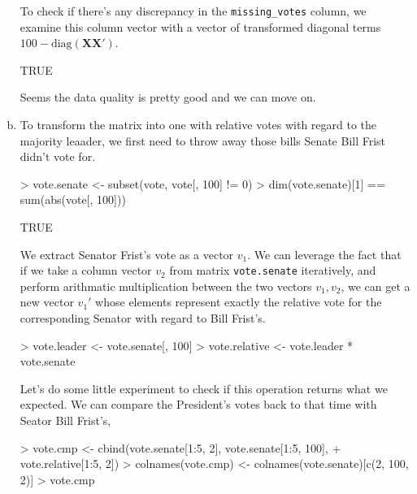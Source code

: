 \documentclass{article}
\begin{document}
\begin{enumerate}[(a)]
    To check if there's any discrepancy in the \verb=missing_votes= column, we examine this column vector with a vector of transformed diagonal terms $100 - \text{diag}(\mathbf{XX}')$.

\begin{Schunk}
\begin{Soutput}
[1] TRUE
\end{Soutput}
\end{Schunk}
    Seems the data quality is pretty good and we can move on.

    \item To transform the matrix into one with relative votes with regard to the majority leaader, we first need to throw away those bills Senate Bill Frist didn't vote for.
\begin{Schunk}
\begin{Sinput}
> vote.senate <- subset(vote, vote[, 100] != 0)
> dim(vote.senate)[1] == sum(abs(vote[, 100]))
\end{Sinput}
\begin{Soutput}
[1] TRUE
\end{Soutput}
\end{Schunk}
    We extract Senator Frist's vote as a vector $v_1$. We can leverage the fact that if we take a column vector $v_2$ from matrix \verb=vote.senate= iteratively, and perform arithmatic multiplication between the two vectors $v_1, v_2$, we can get a new vector $v_1'$ whose elements represent exactly the relative vote for the corresponding Senator with regard to Bill Frist's.
\begin{Schunk}
\begin{Sinput}
> vote.leader <- vote.senate[, 100]
> vote.relative <- vote.leader * vote.senate
\end{Sinput}
\end{Schunk}
    Let's do some little experiment to check if this operation returns what we
    expected. We can compare the President's votes back to that time with Seator Bill Frist's,
\begin{Schunk}
\begin{Sinput}
> vote.cmp <- cbind(vote.senate[1:5, 2], vote.senate[1:5, 100], 
+     vote.relative[1:5, 2])
> colnames(vote.cmp) <- colnames(vote.senate)[c(2, 100, 2)]
> vote.cmp
\end{Sinput}

\end{Schunk}
\end{enumerate}
\end{document}
